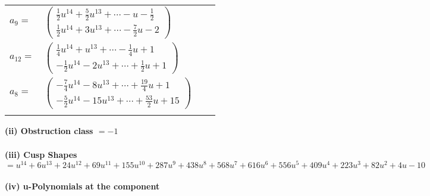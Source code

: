 \documentclass[1p]{elsarticle_modified}
\theoremstyle{definition}
\begin{document}
\begin{tabular}{m{7pt} m{180pt} m{7pt} m{180pt} }
\flushright $a_{9}=$&$\begin{pmatrix}\frac{1}{2} u^{14}+\frac{5}{2} u^{13}+\cdots- u-\frac{1}{2}\\\frac{1}{2} u^{14}+3 u^{13}+\cdots-\frac{7}{2} u-2\end{pmatrix}$ \\
\flushright $a_{12}=$&$\begin{pmatrix}\frac{1}{4} u^{14}+u^{13}+\cdots-\frac{1}{4} u+1\\-\frac{1}{2} u^{14}-2 u^{13}+\cdots+\frac{1}{2} u+1\end{pmatrix}$ \\
\flushright $a_{8}=$&$\begin{pmatrix}-\frac{7}{4} u^{14}-8 u^{13}+\cdots+\frac{19}{4} u+1\\-\frac{5}{2} u^{14}-15 u^{13}+\cdots+\frac{53}{2} u+15\end{pmatrix}$\\&\end{tabular}
\flushleft \textbf{(ii) Obstruction class $= -1$}\\~\\
\flushleft \textbf{(iii) Cusp Shapes $= u^{14}+6 u^{13}+24 u^{12}+69 u^{11}+155 u^{10}+287 u^9+438 u^8+568 u^7+616 u^6+556 u^5+409 u^4+223 u^3+82 u^2+4 u-10$}\\~\\
\newpage\renewcommand{\arraystretch}{1}
\flushleft \textbf{(iv) u-Polynomials at the component}\newline \\
\end{document}
